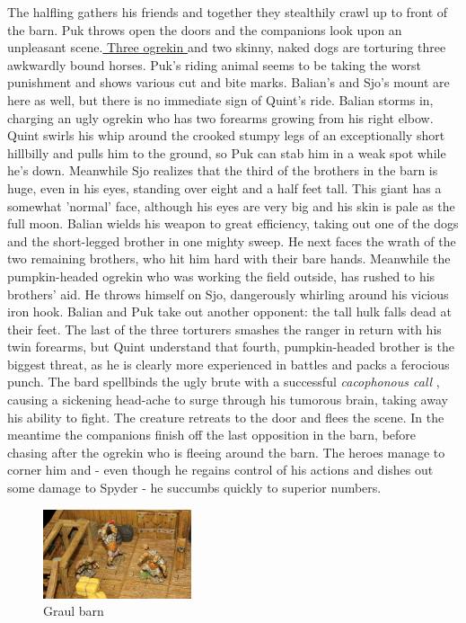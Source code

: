 The halfling gathers his friends and together they stealthily crawl up to front of the barn. Puk throws open the doors and the companions look upon an unpleasant scene.\hyperref[fig:Graul-barn-507694269]{ Three ogrekin } and two skinny, naked dogs are torturing three awkwardly bound horses. Puk's riding animal seems to be taking the worst punishment and shows various cut and bite marks. Balian's and Sjo's mount are here as well, but there is no immediate sign of Quint's ride. Balian storms in, charging an ugly ogrekin who has two forearms growing from his right elbow. Quint swirls his whip around the crooked stumpy legs of an exceptionally short hillbilly and pulls him to the ground, so Puk can stab him in a weak spot while he's down. Meanwhile Sjo realizes that the third of the brothers in the barn is huge, even in his eyes, standing over eight and a half feet tall. This giant has a somewhat 'normal' face, although his eyes are very big and his skin is pale as the full moon. Balian wields his weapon to great efficiency, taking out one of the dogs and the short-legged brother in one mighty sweep. He next faces the wrath of the two remaining brothers, who hit him hard with their bare hands. Meanwhile the pumpkin-headed ogrekin who was working the field outside, has rushed to his brothers' aid. He throws himself on Sjo, dangerously whirling around his vicious iron hook. Balian and Puk take out another opponent: the tall hulk falls dead at their feet. The last of the three torturers smashes the ranger in return with his twin forearms, but Quint understand that fourth, pumpkin-headed brother is the biggest threat, as he is clearly more experienced in battles and packs a ferocious punch. The bard spellbinds the ugly brute with a successful  {\itshape cacophonous call} , causing a sickening head-ache to surge through his tumorous brain, taking away his ability to fight. The creature retreats to the door and flees the scene. In the meantime the companions finish off the last opposition in the barn, before chasing after the ogrekin who is fleeing around the barn. The heroes manage to corner him and - even though he regains control of his actions and dishes out some damage to Spyder - he succumbs quickly to superior numbers. \\

\begin{figure}[h]
	\centering
	\includegraphics[width=0.39\textwidth]{images/Graul-barn-507694269.jpg}
	\caption{Graul barn}
	\label{fig:Graul-barn-507694269}
\end{figure}


